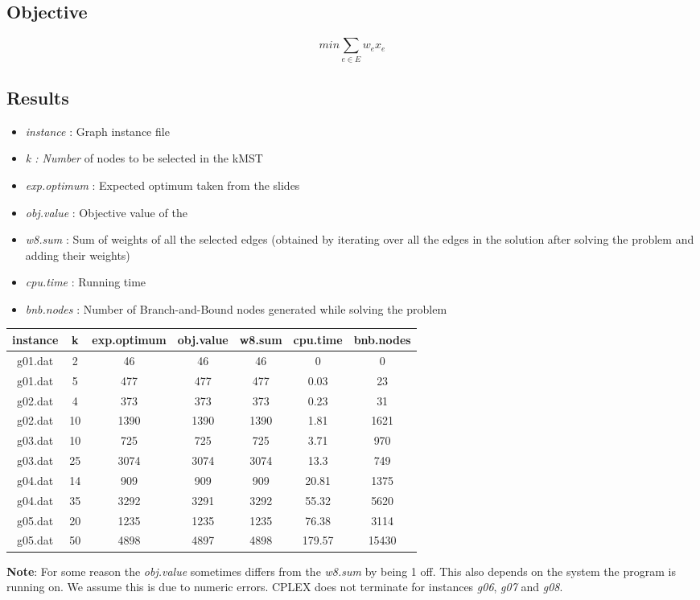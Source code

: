\subsection{Objective}

\[ min \sum_{e \in E}w_ex_e \]

\subsection{Results} \label{4:4}

\begin{itemize}
	\item \textit{instance} : Graph instance file
	\item \textit{k : Number} of nodes to be selected in the kMST
	\item \textit{exp.optimum} : Expected optimum taken from the slides
	\item \textit{obj.value} : Objective value of the 
	\item \textit{w8.sum} : Sum of weights of all the selected edges (obtained by iterating over all the edges in the solution after solving the problem and adding their weights)
	\item \textit{cpu.time} : Running time
	\item \textit{bnb.nodes} : Number of Branch-and-Bound nodes generated while solving the problem
\end{itemize}

\begin{tabular}{ c | c | c | c | c | c | c }
	instance & k & exp.optimum & obj.value & w8.sum & cpu.time & bnb.nodes \\ 
	\hline
	g01.dat & 2 & 46 & 46 & 46 & 0 & 0 \\
	g01.dat & 5 & 477 & 477 & 477 & 0.03 & 23 \\
	g02.dat & 4 & 373 & 373 & 373 & 0.23 & 31 \\
	g02.dat & 10 & 1390 & 1390 & 1390 & 1.81 & 1621 \\
	g03.dat & 10 & 725 & 725 & 725 & 3.71 & 970 \\
	g03.dat & 25 & 3074 & 3074 & 3074 & 13.3 & 749 \\
	g04.dat & 14 & 909 & 909 & 909 & 20.81 & 1375 \\
	g04.dat & 35 & 3292 & 3291 & 3292 & 55.32 & 5620 \\
	g05.dat & 20 & 1235 & 1235 & 1235 & 76.38 & 3114 \\
	g05.dat & 50 & 4898 & 4897 & 4898 & 179.57 & 15430 \\
\end{tabular}

\vspace{0.5cm}

\textbf{Note}: For some reason the \textit{obj.value} sometimes differs from the \textit{w8.sum} by being 1 off. This also depends on the system the program is running on. We assume this is due to numeric errors. CPLEX does not terminate for instances \textit{g06}, \textit{g07} and \textit{g08}.
